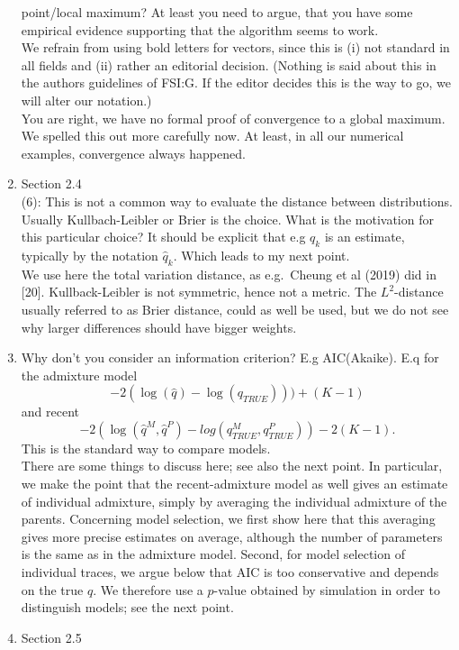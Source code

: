 \documentclass[12pt]{article}
\theoremstyle{definition}
\begin{document}
\begin{enumerate}
  point/local maximum?  At least you need to argue, that you have some
  empirical evidence supporting that the algorithm seems to work.  \\
  {\color{blue}We refrain from using bold letters for vectors, since
    this is (i) not standard in all fields and (ii) rather an
    editorial decision. (Nothing is said about this in the authors
    guidelines of FSI:G. If the editor decides this is the way to go,
    we will alter our notation.)\\You are right, we have no formal proof of convergence to a global maximum. We spelled this out more carefully now. At least, in all our numerical examples,
    convergence always happened.}
\item
  Section 2.4\\
  (6): This is not a common way to evaluate the distance between
  distributions. Usually Kullbach-Leibler or Brier is the choice. What
  is the motivation for this particular choice? It should be explicit
  that e.g $q_k$ is an estimate, typically by the notation $\hat q_k$. Which leads to my next point.
  \\ {\color{blue} We use here the total variation distance, as e.g.\ Cheung et al (2019) did in [20]. Kullback-Leibler is not symmetric, hence not a metric. The $L^2$-distance usually referred to as Brier distance, could as well be used, but we do not see why larger differences should have bigger weights.}
\item Why don’t you consider an information criterion? E.g AIC(Akaike). E.q for the admixture model $$ -2(\log(\hat q) - \log(q_{TRUE}))) + (K - 1)$$
  and recent
  $$-2(\log(\hat q^M, \hat q^P) - log(q^M_{TRUE}, q^P_{TRUE})) - 2(K - 1).$$
  This is the standard way to compare models.
  \\ {\color{blue} There are some things to discuss here; see also the next point. In particular, we make the point that the recent-admixture model as well gives an estimate of individual admixture, simply by averaging the individual admixture of the parents. Concerning model selection, we first show here that this averaging gives more precise estimates on average, although the number of parameters is the same as in the admixture model. Second, for model selection of individual traces, we argue below that AIC is too conservative and depends on the true $q$. We therefore use a $p$-value obtained by simulation in order to distinguish models; see the next point.}
\item
  Section 2.5\\

\end{enumerate}
\end{document}
